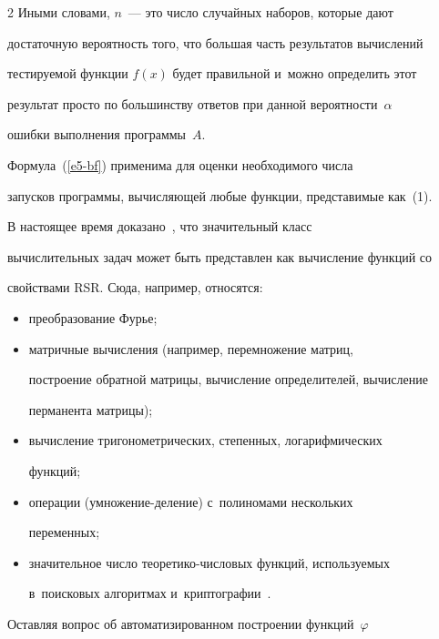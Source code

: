 \begin{multicols}{2}
    Иными словами, $n$~--- это число случайных наборов, которые дают 


достаточную вероятность того, что большая часть результатов вычислений 


тестируемой функции $f(x)$ будет правильной и~можно определить этот 


результат просто по большинству ответов при данной вероятности~$\alpha$ 


ошибки выполнения программы~$A$.


    


    Формула~(\ref{e5-bf}) применима для оценки необходимого числа 


запусков программы, вычисляющей любые функции, представимые как~(1).


    


    В настоящее время доказано~\cite{14-bf, 15-bf}, что значительный класс 


вычислительных задач может быть представлен как вычисление функций со 


свойствами RSR. Сюда, например, относятся:


    \begin{itemize}


  \item  преобразование Фурье;


  \item матричные вычисления (например, перемножение матриц, 


построение обратной матрицы, вычисление определителей, вычисление 


перманента матрицы);


  \item вычисление тригонометрических, степенных, логарифмических 


функций;


  \item операции (умножение-деление) с~полиномами нескольких 


переменных;


  \item значительное число теоретико-числовых функций, используемых 


в~поисковых алгоритмах и~криптографии~\cite{15-bf}.


  \end{itemize}


  


  Оставляя вопрос об автоматизированном построении функций~$\varphi$ 



\end{multicols}
